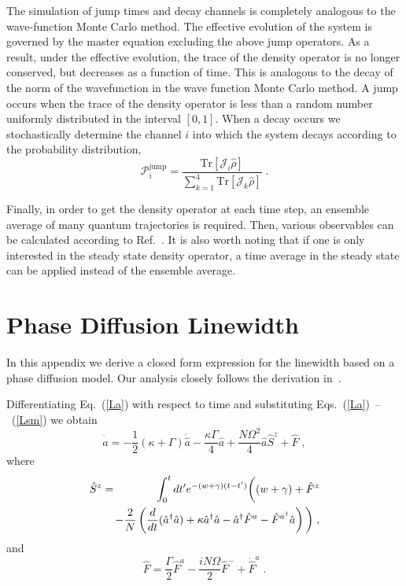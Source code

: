 \documentclass[aps,
twocolumn,
showpacs,
superscriptaddress,groupedaddress]{revtex4}
\begin{document}
The simulation of jump times and decay channels is completely analogous
to the wave-function Monte Carlo method. The effective evolution of the
system is governed by the master equation excluding the above jump
operators. As a result, under the effective evolution, the trace of the
density operator is no longer conserved, but decreases as a function of
time.  This is analogous to the decay of the norm of the wavefunction in
the wave function Monte Carlo method. A jump occurs when the trace of
the density operator is less than a random number uniformly distributed
in the interval $[0,1]$. When a decay occurs we stochastically determine
the channel $i$ into which the system decays according to the
probability distribution,
\begin{equation}
\mathcal{P}_i^{\mathrm{jump}}=
\frac{\mathrm{Tr}[\mathcal{J}_i\hat{\rho}]}
{\sum_{k=1}^4 \mathrm{Tr}[\mathcal{J}_k\hat{\rho}]}\;.
\end{equation}

Finally, in order to get the density operator at each time step, an
ensemble average of many quantum trajectories is required. Then, various
observables can be calculated according to
Ref.~\cite{PhysRevA.87.062101}. It is also worth noting that if one is
only interested in the steady state density operator, a time average in
the steady state can be applied instead of the ensemble average.


\section{Phase Diffusion Linewidth}
\label{HakenAppendix}

In this appendix we derive a closed form expression for the linewidth
based on a phase diffusion model.  Our analysis closely follows the
derivation in~\cite{HakenLaser, HakenLaserBook}.

Differentiating Eq.~(\ref{La}) with respect to time and substituting 
Eqs.~(\ref{La})~--~(\ref{Lsm}) we obtain
\begin{equation}
\ddot{\hat{a}} =
-\frac{1}{2} (\kappa+\Gamma)  \dot{\hat{a}} -
\frac{\kappa \Gamma}{4}\hat{a}  +
\frac{N \Omega^2 }{4} \hat{a} \hat{S}^z +\hat{F}\;,
\label{addeq}
\end{equation}
where
\begin{eqnarray}
\hat{S}^z &=&
\int_0^t dt^{\prime} e^{-(w+\gamma)(t-t^{\prime})}
\bigg( (w+\gamma) + \hat{F}^z
\nonumber
\\
&&\hspace{-3mm}-\frac{2}{N} \left( \frac{d}{dt} (\hat{a}^{\dagger} \hat{a}) +
\kappa \hat{a}^{\dagger} \hat{a} -\hat{a}^{\dagger} \hat{F}^a -
\hat{F}^{a^{\dagger}} \hat{a} \right) \bigg)\;,
\end{eqnarray}
and
\begin{equation}
\hat{F} = \frac{\Gamma}{2} \hat{F}^a-
\frac{i N \Omega}{2} \hat{F}^-+\dot{\hat{F}}^a\;.
\end{equation}
\end{document}
